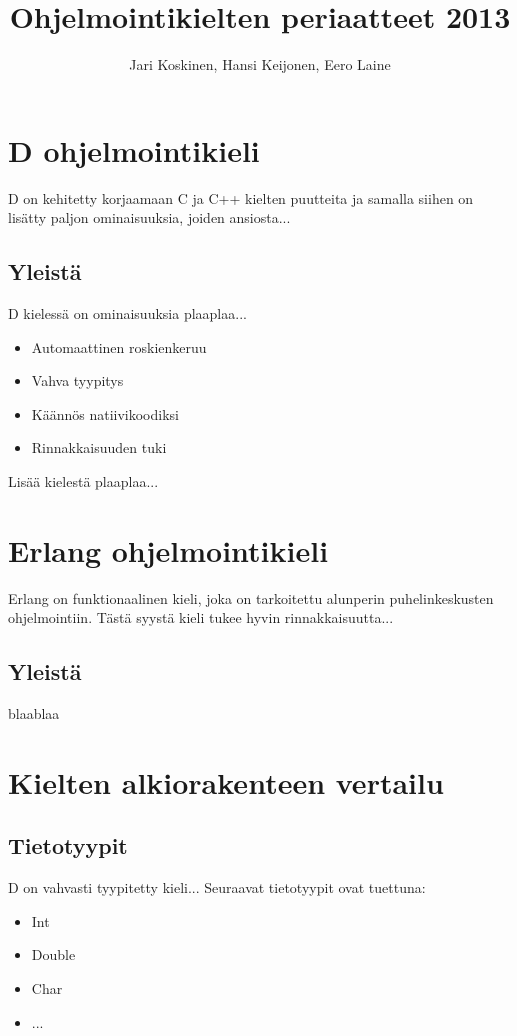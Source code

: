\documentclass[11pt,oneside,a4paper]{article}
\author{Jari Koskinen, Hansi Keijonen, Eero Laine}
\title{Ohjelmointikielten periaatteet 2013}
\begin{document}
\maketitle

\pagebreak

\tableofcontents

\pagebreak

\section{D ohjelmointikieli}
D on kehitetty korjaamaan C ja C++ kielten puutteita ja samalla siihen on lisätty paljon ominaisuuksia, joiden ansiosta...
\subsection{Yleistä}
D kielessä on ominaisuuksia plaaplaa...
\begin{itemize}
\item Automaattinen roskienkeruu
\item Vahva tyypitys
\item Käännös natiivikoodiksi
\item Rinnakkaisuuden tuki
\end{itemize}
Lisää kielestä plaaplaa...

\section{Erlang ohjelmointikieli}
Erlang on funktionaalinen kieli, joka on tarkoitettu alunperin puhelinkeskusten ohjelmointiin. Tästä syystä kieli tukee hyvin rinnakkaisuutta...
\subsection{Yleistä}
blaablaa
\section{Kielten alkiorakenteen vertailu}
\subsection{Tietotyypit}
D on vahvasti tyypitetty kieli...
Seuraavat tietotyypit ovat tuettuna:
\begin{itemize}
\item Int
\item Double
\item Char
\item ...
\end{itemize}
\end{document}
